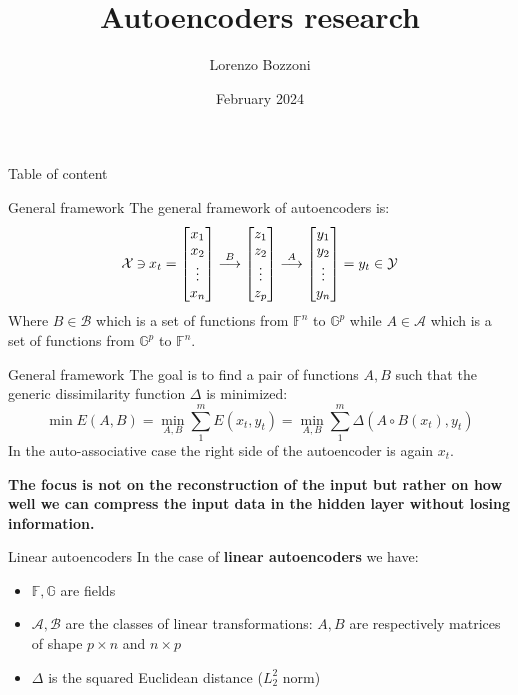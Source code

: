 \documentclass{beamer}
\title{Autoencoders research}
\author{Lorenzo Bozzoni}
\institute{Politecnico di Milano}
\date{February 2024}
\newcommand{\revin}{\mathbin{\rotatebox[origin=c]{180}{$\in$}}}
\begin{document}
\frame{\titlepage}

\begin{frame}{Table of content}
    \tableofcontents
\end{frame}



\begin{frame}{General framework}
The general framework of autoencoders is:
\[
\mathcal{X} \revin x_t = 
\begin{bmatrix}
    x_1\\
    x_2\\
    \vdots\\
    x_n
\end{bmatrix}
\overset{B}{\longrightarrow}
\begin{bmatrix}
    z_1\\
    z_2\\
    \vdots\\
    z_p
\end{bmatrix}
\overset{A}{\longrightarrow}
\begin{bmatrix}
    y_1\\
    y_2\\
    \vdots\\
    y_n
\end{bmatrix}
= y_t \in \mathcal{Y}
\]
Where $B \in \mathcal{B}$ which is a set of functions from $\mathbb{F}^n$ to $\mathbb{G}^p$ while $A \in \mathcal{A}$ which is a set of functions from $\mathbb{G}^p$ to $\mathbb{F}^n$.


\end{frame}

\begin{frame}{General framework}
The goal is to find a pair of functions $A,B$ such that the generic dissimilarity function $\Delta$ is minimized:
\[
\min E(A,B) = \min_{A,B} \sum_1^m E(x_t,y_t) = \min_{A,B} \sum_1^m \Delta(A \circ B(x_t),y_t)  
\]
In the auto-associative case the right side of the autoencoder is again $x_t$.

\textbf{The focus is not on the reconstruction of the input but rather on how well we can compress the input data in the hidden layer without losing information.}
\end{frame}



\begin{frame}{Linear autoencoders}
In the case of \textbf{linear autoencoders} we have:
\begin{itemize}
    \item $\mathbb{F},\mathbb{G}$ are fields
    \item $\mathcal{A},\mathcal{B}$ are the classes of linear transformations: $A,B$ are respectively matrices of shape $p \times n$ and $n \times p$
    \item $\Delta$ is the squared Euclidean distance ($L_2^2$ norm)
\end{itemize}
\end{frame}
\end{document}
